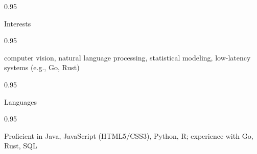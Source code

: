 \documentclass[a4paper,9pt]{article}
\newcommand{\doubleColumnGap}{\hspace{4mm}}
\newcommand{\withinSectionMarginBetween}{\vspace{-2.75ex}}
\newcommand{\mainLineSpacing}{0.95}
\begin{document}
\begin{minipage}[t]{0.20\linewidth}
  \begin{small}
    \begin{spacing}\mainLineSpacing{}
      \begin{flushright}
        Interests
      \end{flushright}
    \end{spacing}
  \end{small}
\end{minipage}
\doubleColumnGap{}
\begin{minipage}[t]{0.75\linewidth}
  \begin{small}
    \begin{spacing}\mainLineSpacing{}
      \begin{flushleft}
        computer vision, natural language processing, statistical modeling, low-latency systems (e.g., Go, Rust)
      \end{flushleft}
    \end{spacing}
  \end{small}
\end{minipage}

\withinSectionMarginBetween{}

\begin{minipage}[t]{0.20\linewidth}
  \begin{small}
    \begin{spacing}\mainLineSpacing{}
      \begin{flushright}
        Languages
      \end{flushright}
    \end{spacing}
  \end{small}
\end{minipage}
\doubleColumnGap{}
\begin{minipage}[t]{0.75\linewidth}
  \begin{small}
    \begin{spacing}\mainLineSpacing{}
      \begin{flushleft}
        Proficient in Java, JavaScript (HTML5/CSS3), Python, R; experience with Go, Rust, SQL
      \end{flushleft}
    \end{spacing}
  \end{small}
\end{minipage}

\withinSectionMarginBetween{}
\end{document}
